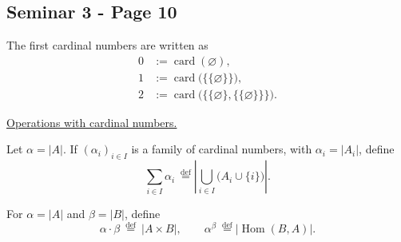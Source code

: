 
\subsection*{Seminar 3 - Page 10}
\begingroup
\setlength{\abovedisplayskip}{5pt}
\setlength{\belowdisplayskip}{5pt}
\setlength{\abovedisplayshortskip}{3pt}
\setlength{\belowdisplayshortskip}{3pt}

\noindent The first cardinal numbers are written as
\[
\begin{aligned}
0 &:= \operatorname{card}(\varnothing),\\
1 &:= \operatorname{card}\bigl(\{\{\varnothing\}\}\bigr),\\
2 &:= \operatorname{card}\bigl(\{\{\varnothing\},\{\{\varnothing\}\}\}\bigr).
\end{aligned}
\]

\medskip
\noindent\underline{Operations with cardinal numbers.}

Let $\alpha=|A|$. If $(\alpha_i)_{i\in I}$ is a family of cardinal
numbers, with $\alpha_i=|A_i|$, define
\[
\sum_{i\in I}\alpha_i\ \overset{\mathrm{def}}{=}
\left|\bigcup_{i\in I}\bigl(A_i\cup\{i\}\bigr)\right|.
\]

\noindent For $\alpha=|A|$ and $\beta=|B|$, define
\[
\alpha\cdot\beta\ \overset{\mathrm{def}}{=}\ |A\times B|,
\qquad
\alpha^{\beta}\ \overset{\mathrm{def}}{=}
\bigl|\operatorname{Hom}(B,A)\bigr|.
\]


